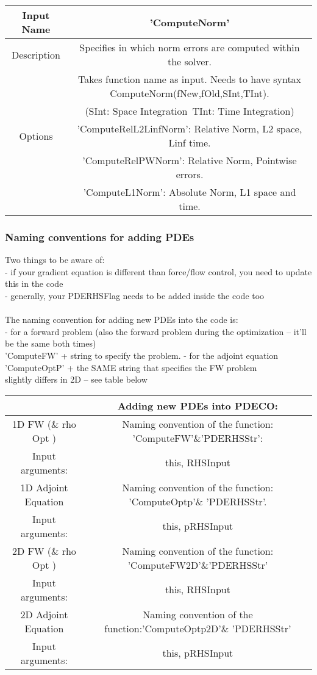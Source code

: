 \documentclass[11pt, a4paper]{article}
\theoremstyle{definition}
\begin{document}
   \begin{center}
	\begin{tabular}{ |c| c | }
		\hline
		Input Name & 'ComputeNorm' \\ 
		\hline
		Description & Specifies in which norm errors are computed within the solver. \\
		& Takes function name as input. Needs to have syntax ComputeNorm(fNew,fOld,SInt,TInt).\\ 
		&  (SInt: Space Integration\ TInt: Time Integration)\\
		\hline 
		Options & 'ComputeRelL2LinfNorm': Relative Norm, L2 space, Linf time.  \\
		& 'ComputeRelPWNorm': Relative Norm, Pointwise errors. \\
		& 'ComputeL1Norm': Absolute Norm, L1 space and time. \\
		\hline
	\end{tabular}
   \end{center}	



\subsubsection*{Naming conventions for adding PDEs}	
Two things to be aware of: \\
- if your gradient equation is different than force/flow control, you need to update this in the code\\
- generally, your PDERHSFlag needs to be added inside the code too\\
\\
The naming convention for adding new PDEs into the code is:\\
- for a forward problem (also the forward problem during the optimization -- it'll be the same both times)\\
'ComputeFW' + string to specify the problem.
- for the adjoint equation\\
'ComputeOptP' + the SAME string that specifies the FW problem\\
slightly differs in 2D -- see table below
\begin{center}
	\begin{tabular}{ |c| c | }
\hline
 & Adding new PDEs into PDECO: \\
 \hline
1D FW (\& rho Opt )& Naming convention of the function: 'ComputeFW'\&'PDERHSStr':\\ 
Input arguments:& this, RHSInput \\
\hline
1D Adjoint Equation & Naming convention of the function: 'ComputeOptp'\& 'PDERHSStr'. \\
Input arguments:& this, pRHSInput\\
\hline
2D FW (\& rho Opt ) & Naming convention of the function: 'ComputeFW2D'\&'PDERHSStr'\\
Input arguments: & this, RHSInput\\ 
\hline
2D Adjoint Equation & Naming convention of the function:'ComputeOptp2D'\& 'PDERHSStr'\\
Input arguments:& this, pRHSInput\\ 
\hline
	\end{tabular}
\end{center}	
\end{document}
